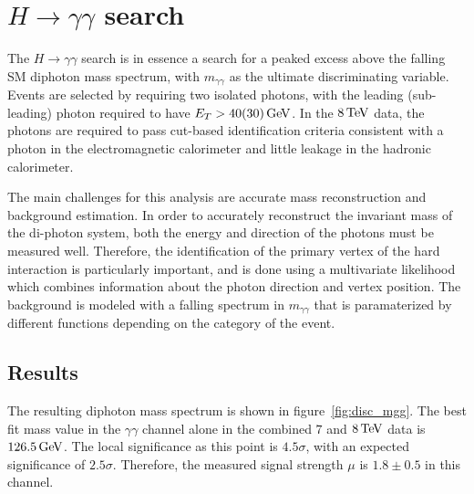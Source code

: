 \section{$H\to\gamma\gamma$ search}

The $H\to\gamma\gamma$ search is in essence a search for a peaked excess above the falling SM diphoton mass spectrum, with $m_{\gamma\gamma}$ as the ultimate discriminating variable. Events are selected by requiring two isolated photons, with the leading (sub-leading) photon required to have $E_{T} > 40 (30) \GeV$. In the $8 \TeV$ data, the photons are required to pass cut-based identification criteria consistent with a photon in the electromagnetic calorimeter and little leakage in the hadronic calorimeter. 

The main challenges for this analysis are accurate mass reconstruction and background estimation. In order to accurately reconstruct the invariant mass of the di-photon system, both the energy and direction of the photons must be measured well. Therefore, the identification of the primary vertex of the hard interaction is particularly important, and is done using a multivariate likelihood which combines information about the photon direction and vertex position. The background is modeled with a falling spectrum in $m_{\gamma\gamma}$ that is paramaterized by different functions depending on the category of the event.

\subsection{Results}

The resulting diphoton mass spectrum is shown in figure~\ref{fig:disc_mgg}. The best fit mass value in the $\gamma\gamma$ channel alone in the combined $7$ and $8 \TeV$ data is $126.5 \GeV$. The local significance as this point is $4.5\sigma$, with an expected significance of $2.5\sigma$. Therefore, the measured signal strength $\mu$ is $1.8 \pm 0.5$ in this channel. 

